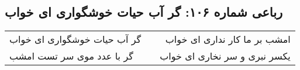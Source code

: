 \begin{center}
\section*{رباعی شماره ۱۰۶: گر آب حیات خوشگواری ای خواب}
\label{sec:0106}
\begin{longtable}{l p{0.5cm} r}
گر آب حیات خوشگواری ای خواب
&&
امشب بر ما کار نداری ای خواب
\\
گر با عدد موی سر تست امشب
&&
یکسر نبری و سر نخاری ای خواب
\\
\end{longtable}
\end{center}
